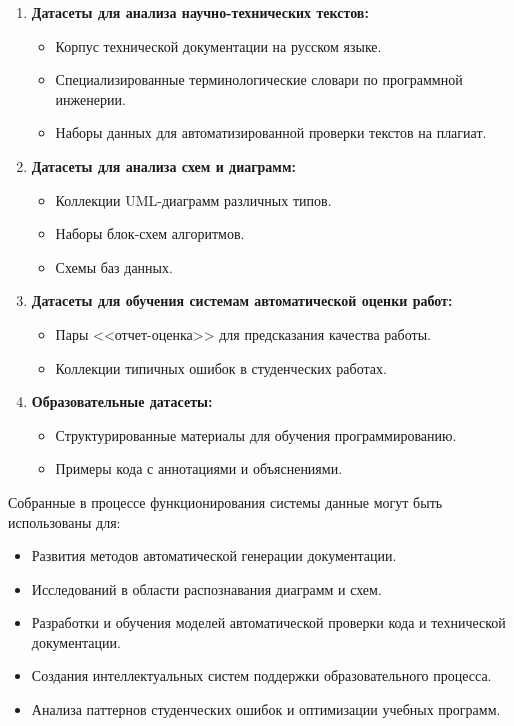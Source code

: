 \begin{enumerate}[wide=12.5mm, leftmargin=12.5mm]
    \item \textbf{Датасеты для анализа научно-технических текстов:}
    \begin{itemize}[wide=12.5mm, leftmargin=12.5mm]
        \item Корпус технической документации на русском языке.
        \item Специализированные терминологические словари по программной инженерии.
        \item Наборы данных для автоматизированной проверки текстов на плагиат.
    \end{itemize}
    \item \textbf{Датасеты для анализа схем и диаграмм:}
    \begin{itemize}[wide=12.5mm, leftmargin=12.5mm]
        \item Коллекции UML-диаграмм различных типов.
        \item Наборы блок-схем алгоритмов.
        \item Схемы баз данных.
    \end{itemize}
    \item \textbf{Датасеты для обучения системам автоматической оценки работ:}
    \begin{itemize}[wide=12.5mm, leftmargin=12.5mm]
        \item Пары <<отчет-оценка>> для предсказания качества работы.
        \item Коллекции типичных ошибок в студенческих работах.
    \end{itemize}
    \item \textbf{Образовательные датасеты:}
    \begin{itemize}[wide=12.5mm, leftmargin=12.5mm]
        \item Структурированные материалы для обучения программированию.
        \item Примеры кода с аннотациями и объяснениями.
    \end{itemize}
\end{enumerate}

Собранные в процессе функционирования системы данные могут быть использованы для:

\begin{itemize}[wide=12.5mm, leftmargin=12.5mm]
\item Развития методов автоматической генерации документации.
\item Исследований в области распознавания диаграмм и схем.
\item Разработки и обучения моделей автоматической проверки кода и технической документации.
\item Создания интеллектуальных систем поддержки образовательного процесса.
\item Анализа паттернов студенческих ошибок и оптимизации учебных программ.
\end{itemize}

